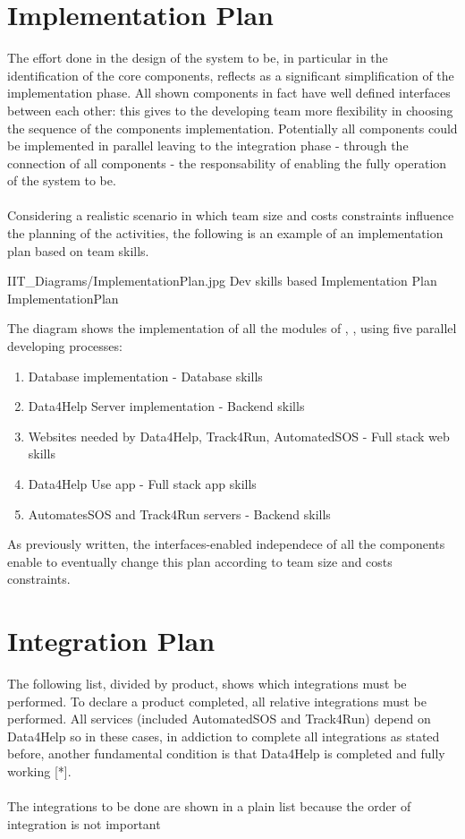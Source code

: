 \documentclass[../DD.tex]{subfiles}
\begin{document}
	\section{Implementation Plan}
		The effort done in the design of the system to be, in particular in the identification of the core components, reflects as a significant simplification of the implementation phase. All shown components in fact have well defined interfaces between each other: this gives to the developing team more flexibility in choosing the sequence of the components implementation. Potentially all components could be implemented in parallel leaving to the integration phase - through the connection of all components - the responsability of enabling the fully operation of the system to be. \\ \\
		Considering a realistic scenario in which team size and costs constraints influence the planning of the activities, the following is an example of an implementation plan based on team skills.
		
		\image {13cm} {IIT_Diagrams/ImplementationPlan.jpg} {Dev skills based Implementation Plan} {ImplementationPlan}

		The diagram shows the implementation of all the modules of , ,  using five parallel developing processes:
\begin{enumerate}
	\item Database implementation - Database skills
	\item Data4Help Server implementation - Backend skills
	\item Websites needed by Data4Help, Track4Run, AutomatedSOS - Full stack web skills
	\item Data4Help Use app - Full stack app skills
	\item AutomatesSOS and Track4Run servers - Backend skills
\end{enumerate}
As previously written, the interfaces-enabled independece of all the components enable to eventually change this plan according to team size and costs constraints. 

	\section{Integration Plan}
		The following list, divided by product, shows which integrations must be performed. To declare a product completed, all relative integrations must be performed. All services (included AutomatedSOS and Track4Run) depend on Data4Help so in these cases, in addiction to complete all integrations as stated before, another fundamental condition is that Data4Help is completed and fully working [*].\\ \\
		The integrations to be done are shown in a plain list because the order of integration is not important
\end{document}
